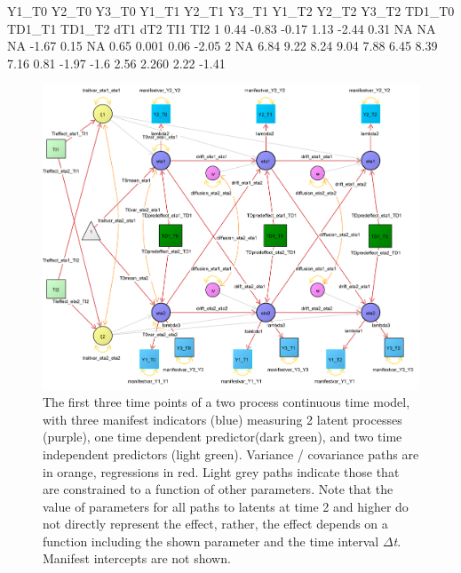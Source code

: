 \documentclass[nojss]{jss}\usepackage[]{graphicx}\usepackage[]{color}
\begin{document}
\begin {scriptsize}
\begin{Schunk}
\begin{Soutput}
  Y1_T0 Y2_T0 Y3_T0 Y1_T1 Y2_T1 Y3_T1 Y1_T2 Y2_T2 Y3_T2 TD1_T0 TD1_T1 TD1_T2  dT1   dT2  TI1   TI2
1  0.44 -0.83 -0.17  1.13 -2.44  0.31    NA    NA    NA  -1.67   0.15     NA 0.65 0.001 0.06 -2.05
2    NA  6.84  9.22  8.24  9.04  7.88  6.45  8.39  7.16   0.81  -1.97   -1.6 2.56 2.260 2.22 -1.41
\end{Soutput}
\end{Schunk}
\end{scriptsize}

\begin{figure}[p]
\includegraphics[width = \textwidth]{pathdiagramtwoprocessfull2}
\caption{ \label{fig:pathdiagramtwoprocessfull} The first three time points of a two process continuous time model, with three manifest indicators (blue) measuring 2 latent processes (purple), one time dependent predictor(dark green), and two time independent predictors (light green). Variance / covariance paths are in orange, regressions in red. Light grey paths indicate those that are constrained to a function of other parameters. Note that the value of parameters for all paths to latents at time 2 and higher do not directly represent the effect, rather, the effect depends on a function including the shown parameter and the time interval $\Delta$\textit{t}. Manifest intercepts are not shown.}
\end{figure}
\end{document}
